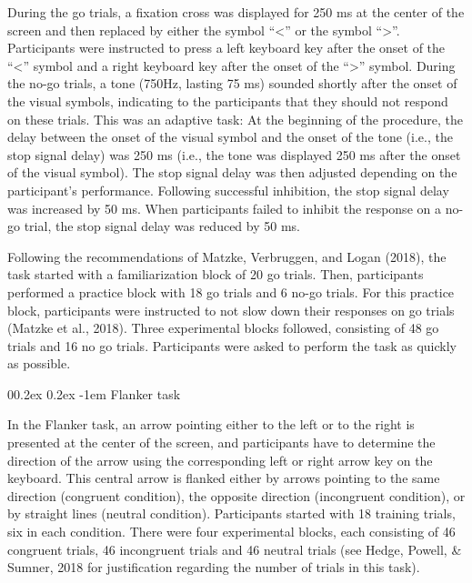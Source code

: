 \documentclass[
  man,floatsintext]{apa6}
\makeatletter
\let\oldparagraph\paragraph
\renewcommand{\paragraph}[1]{\oldparagraph{#1}\mbox{}}
\renewcommand{\paragraph}{\@startsection{paragraph}{4}{\parindent}%
  {0\baselineskip \@plus 0.2ex \@minus 0.2ex}%
  {-1em}%
  {\normalfont\normalsize\bfseries\itshape\typesectitle}}
\makeatother
\begin{document}
During the go trials, a fixation cross was displayed for 250 ms at the center of the screen and then replaced by either the symbol ``\textless{}'' or the symbol ``\textgreater{}''. Participants were instructed to press a left keyboard key after the onset of the ``\textless{}'' symbol and a right keyboard key after the onset of the ``\textgreater{}'' symbol. During the no-go trials, a tone (750Hz, lasting 75 ms) sounded shortly after the onset of the visual symbols, indicating to the participants that they should not respond on these trials. This was an adaptive task: At the beginning of the procedure, the delay between the onset of the visual symbol and the onset of the tone (i.e., the stop signal delay) was 250 ms (i.e., the tone was displayed 250 ms after the onset of the visual symbol). The stop signal delay was then adjusted depending on the participant's performance. Following successful inhibition, the stop signal delay was increased by 50 ms. When participants failed to inhibit the response on a no-go trial, the stop signal delay was reduced by 50 ms.

Following the recommendations of Matzke, Verbruggen, and Logan (2018), the task started with a familiarization block of 20 go trials. Then, participants performed a practice block with 18 go trials and 6 no-go trials. For this practice block, participants were instructed to not slow down their responses on go trials (Matzke et al., 2018). Three experimental blocks followed, consisting of 48 go trials and 16 no go trials. Participants were asked to perform the task as quickly as possible.

\hypertarget{flanker-task}{%
\paragraph{Flanker task}\label{flanker-task}}

In the Flanker task, an arrow pointing either to the left or to the right is presented at the center of the screen, and participants have to determine the direction of the arrow using the corresponding left or right arrow key on the keyboard. This central arrow is flanked either by arrows pointing to the same direction (congruent condition), the opposite direction (incongruent condition), or by straight lines (neutral condition). Participants started with 18 training trials, six in each condition. There were four experimental blocks, each consisting of 46 congruent trials, 46 incongruent trials and 46 neutral trials (see Hedge, Powell, \& Sumner, 2018 for justification regarding the number of trials in this task).
\end{document}
